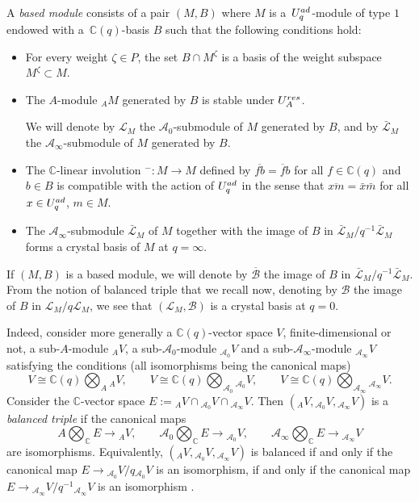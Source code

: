 \documentclass[11pt]{article}
\numberwithin{equation}{section}
\numberwithin{equation}{section}
\theoremstyle{definition}
\newcommand{\mc}{\mathbb{C}}
\newcommand{\Ll}{{\mathcal L}}
\newcommand{\ra}{\rightarrow}
\begin{document}
 A {\it based module} consists of a pair $(M,B)$ where $M$ is a~$U_q^{\rm ad}$-module of type $1$ endowed with a~$\mc(q)$-basis $B$ such that the following conditions hold:
\begin{itemize}\itemsep=0pt
\item[(i)] For every weight $\zeta\in P$, the set $B\cap M^{\zeta}$ is a basis of the weight subspace $M^{\zeta}\subset M$.
\item[(ii)] The $A$-module ${}_A M$ generated by $B$ is stable under $U_A^{\rm res}$.


We will denote by $\Ll_M$ the $\mathcal{A}_0$-submodule of $M$ generated by $B$, and by $\bar{\Ll}_M$ the $\mathcal{A}_\infty$-submodule of $M$ generated by $B$.


\item[(iii)] The $\mc$-linear involution ${}^-\colon M\ra M$ defined by $\overline{fb} = \overline{f}b$ for all $f\in \mc(q)$ and $b\in B$ is compatible with the action of $U_q^{\rm ad}$ in the sense that $\overline{xm} = \bar{x}\bar{m}$ for all $x\in U_q^{\rm ad}$, $m\in M$.
\item[(iv)] The $\mathcal{A}_\infty$-submodule $\bar{\Ll}_M$ of $M$ together with the image of $B$ in $\bar{\Ll}_M/q^{-1}\bar{\Ll}_M$ forms a crystal basis of $M$ at $q=\infty$.
\end{itemize}
If $(M,B)$ is a based module, we will denote by $\overline{\mathcal{B}}$ the image of $B$ in $\bar{\Ll}_M/q^{-1}\bar{\Ll}_M$. From the notion of balanced triple that we recall now, denoting by $\mathcal{B}$ the image of $B$ in $\Ll_M/q\Ll_M$, we see that $(\Ll_M,\mathcal{B})$ is a crystal basis at $q=0$.

Indeed, consider more generally a $\mc(q)$-vector space $V$, finite-dimensional or not, a sub-$A$-module ${}_AV$, a sub-$\mathcal{A}_0$-module ${}_{\mathcal{A}_0}V$ and a sub-$\mathcal{A}_\infty$-module ${}_{\mathcal{A}_\infty}V$ satisfying the conditions (all isomorphisms being the canonical maps)
\[V\cong \mc(q) \bigotimes_A {}_AV ,\qquad V\cong \mc(q) \bigotimes_{\mathcal{A}_0} {}_{\mathcal{A}_0}V ,\qquad V\cong \mc(q) \bigotimes_{\mathcal{A}_\infty} {}_{\mathcal{A}_\infty}V.\]
Consider the $\mc$-vector space $E := {}_AV \cap {}_{\mathcal{A}_0}V \cap {}_{\mathcal{A}_\infty}V$. Then $({}_AV, {}_{\mathcal{A}_0}V,{}_{\mathcal{A}_\infty}V)$ is a {\it balanced triple} \cite{Kashiwara1,Kashiwara2} if the canonical maps
\begin{equation}\label{condbalanced}
A \bigotimes_\mc E \ra {}_AV,\qquad \mathcal{A}_0 \bigotimes_\mc E \ra {}_{\mathcal{A}_0}V ,\qquad \mathcal{A}_\infty \bigotimes_\mc E \ra {}_{\mathcal{A}_\infty}V
\end{equation}
are isomorphisms. Equivalently, $({}_AV, {}_{\mathcal{A}_0}V,{}_{\mathcal{A}_\infty}V)$ is balanced if and only if the canonical map $E \ra {}_{\mathcal{A}_0}V/q{}_{\mathcal{A}_0}V$ is an isomorphism, if and only if the canonical map $E \ra {}_{\mathcal{A}_\infty}V/q^{-1}{}_{\mathcal{A}_\infty}V$ is an isomorphism \cite[Lemma 2.1.1]{Kashiwara2}.
\end{document}
